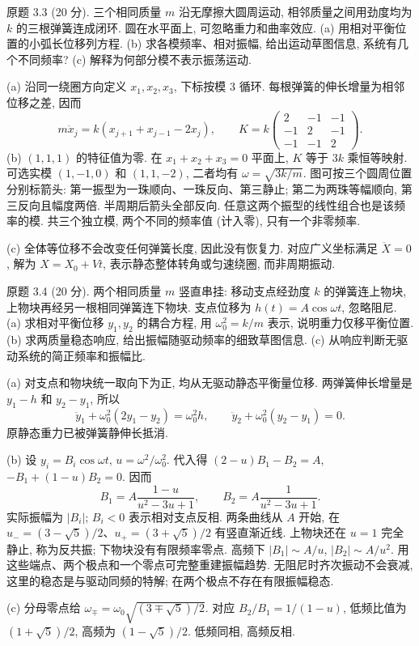 \begin{exercise}\label{ps:3.3}
原题 3.3 (20 分). 三个相同质量 $m$ 沿无摩擦大圆周运动, 相邻质量之间用劲度均为 $k$ 的三根弹簧连成闭环. 圆在水平面上, 可忽略重力和曲率效应. (a) 用相对平衡位置的小弧长位移列方程. (b) 求各模频率、相对振幅, 给出运动草图信息, 系统有几个不同频率? (c) 解释为何部分模不表示振荡运动.
\end{exercise}
\begin{solution}
(a) 沿同一绕圈方向定义 $x_1,x_2,x_3$, 下标按模 3 循环. 每根弹簧的伸长增量为相邻位移之差, 因而
\[
m\ddot x_j=k(x_{j+1}+x_{j-1}-2x_j),\qquad
K=k\begin{pmatrix}2&-1&-1\\-1&2&-1\\-1&-1&2\end{pmatrix}.
\]
(b) $(1,1,1)$ 的特征值为零. 在 $x_1+x_2+x_3=0$ 平面上, $K$ 等于 $3k$ 乘恒等映射. 可选实模 $(1,-1,0)$ 和 $(1,1,-2)$, 二者均有 $\omega=\sqrt{3k/m}$. 图可按三个圆周位置分别标箭头: 第一振型为一珠顺向、一珠反向、第三静止; 第二为两珠等幅顺向, 第三反向且幅度两倍. 半周期后箭头全部反向. 任意这两个振型的线性组合也是该频率的模. 共三个独立模, 两个不同的频率值 (计入零), 只有一个非零频率.

(c) 全体等位移不会改变任何弹簧长度, 因此没有恢复力. 对应广义坐标满足 $\ddot X=0$, 解为 $X=X_0+Vt$, 表示静态整体转角或匀速绕圈, 而非周期振动.
\end{solution}
\begin{exercise}\label{ps:3.4}
原题 3.4 (20 分). 两个相同质量 $m$ 竖直串挂: 移动支点经劲度 $k$ 的弹簧连上物块, 上物块再经另一根相同弹簧连下物块. 支点位移为 $h(t)=A\cos\omega t$, 忽略阻尼. (a) 求相对平衡位移 $y_1,y_2$ 的耦合方程, 用 $\omega_0^2=k/m$ 表示, 说明重力仅移平衡位置. (b) 求两质量稳态响应, 给出振幅随驱动频率的细致草图信息. (c) 从响应判断无驱动系统的简正频率和振幅比.
\end{exercise}
\begin{solution}
(a) 对支点和物块统一取向下为正, 均从无驱动静态平衡量位移. 两弹簧伸长增量是 $y_1-h$ 和 $y_2-y_1$, 所以
\[
\ddot y_1+\omega_0^2(2y_1-y_2)=\omega_0^2h,\qquad
\ddot y_2+\omega_0^2(y_2-y_1)=0.
\]
原静态重力已被弹簧静伸长抵消.

(b) 设 $y_i=B_i\cos\omega t$, $u=\omega^2/\omega_0^2$. 代入得 $(2-u)B_1-B_2=A$, $-B_1+(1-u)B_2=0$. 因而
\[
B_1=A\frac{1-u}{u^2-3u+1},\qquad B_2=A\frac1{u^2-3u+1}.
\]
实际振幅为 $|B_i|$; $B_i<0$ 表示相对支点反相. 两条曲线从 $A$ 开始, 在 $u_-=(3-\sqrt5)/2$、$u_+=(3+\sqrt5)/2$ 有竖直渐近线. 上物块还在 $u=1$ 完全静止, 称为反共振; 下物块没有有限频率零点. 高频下 $|B_1|\sim A/u$, $|B_2|\sim A/u^2$. 用这些端点、两个极点和一个零点可完整重建振幅趋势. 无阻尼时齐次振动不会衰减, 这里的稳态是与驱动同频的特解; 在两个极点不存在有限振幅稳态.

(c) 分母零点给 $\omega_\mp=\omega_0\sqrt{(3\mp\sqrt5)/2}$. 对应 $B_2/B_1=1/(1-u)$, 低频比值为 $(1+\sqrt5)/2$, 高频为 $(1-\sqrt5)/2$. 低频同相, 高频反相.
\end{solution}
